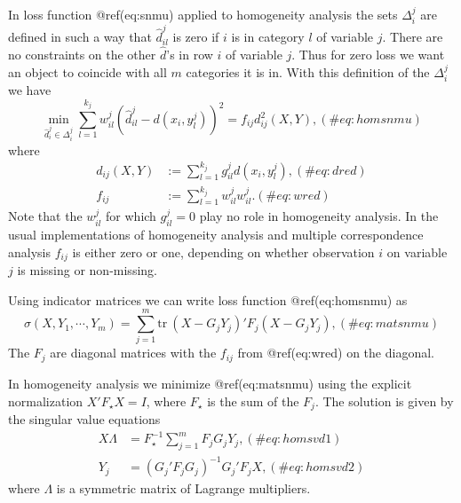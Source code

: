 \documentclass[
  12pt,
  letterpaper,
  DIV=11,
  numbers=noendperiod]{scrartcl}
\begin{document}
In loss function @ref(eq:snmu) applied to homogeneity analysis the sets
\(\Delta_i^j\) are defined in such a way that \(\hat d_{il}^j\) is zero
if \(i\) is in category \(l\) of variable \(j\). There are no
constraints on the other \(\hat d\)'s in row \(i\) of variable \(j\).
Thus for zero loss we want an object to coincide with all \(m\)
categories it is in. With this definition of the \(\Delta_i^j\) we have
\begin{equation}
\min_{\hat d_i^j\in\Delta_i^j}\sum_{l=1}^{k_j}w_{il}^j(\hat d_{il}^j-d(x_i,y_l^j))^2=f_{ij}d_{ij}^2(X,Y),
(\#eq:homsnmu)
\end{equation} where \begin{subequations}
\begin{align}
d_{ij}(X,Y)&:=\sum_{l=1}^{k_j}g_{il}^jd(x_i,y^j_l),(\#eq:dred)\\
f_{ij}&:=\sum_{l=1}^{k_j}w^j_{il}w^j_{il}.(\#eq:wred)
\end{align}
\end{subequations} Note that the \(w^j_{il}\) for which \(g^j_{il}=0\)
play no role in homogeneity analysis. In the usual implementations of
homogeneity analysis and multiple correspondence analysis \(f_{ij}\) is
either zero or one, depending on whether observation \(i\) on variable
\(j\) is missing or non-missing.

Using indicator matrices we can write loss function @ref(eq:homsnmu) as
\begin{equation}
\sigma(X,Y_1,\cdots,Y_m)=
\sum_{j=1}^m\text{tr}\ (X-G_jY_j)'F_j(X-G_jY_j),
(\#eq:matsnmu)
\end{equation} The \(F_j\) are diagonal matrices with the \(f_{ij}\)
from @ref(eq:wred) on the diagonal.

In homogeneity analysis we minimize @ref(eq:matsnmu) using the explicit
normalization \(X'F_\star X=I\), where \(F_\star\) is the sum of the
\(F_j\). The solution is given by the singular value equations
\begin{subequations}
\begin{align}
X\Lambda&=F_\star^{-1}\sum_{j=1}^m F_jG_jY_j,(\#eq:homsvd1)\\
Y_j&=(G_j'F_jG_j)^{-1}G_j'F_jX,(\#eq:homsvd2)
\end{align}
\end{subequations} where \(\Lambda\) is a symmetric matrix of Lagrange
multipliers.
\end{document}
